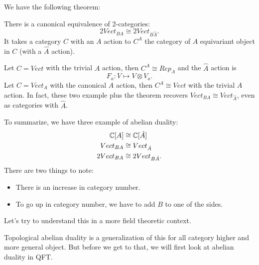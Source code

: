 \documentclass[./main]{subfiles}
\begin{document}
We have the following theorem:
\begin{theorem}
There is a canonical equivalence of 2-categories:
    \begin{equation}
        2Vect_{BA} \cong 2Vect_{B\hat{A}}.
    \end{equation}
It takes a category $C$ with an $A$ action to $C^A$ the category of $A$ equivariant object in $C$ (with a $\hat{A}$ action).
\end{theorem}

\begin{example}
Let $C = Vect$ with the trivial $A$ action, then $C^A \cong Rep_A$ and the $\hat{A}$ action is 
\begin{equation}
    F_a: V \mapsto V \otimes V_a.
\end{equation}
Let $C = Vect_A$ with the canonical $A$ action, then $C^A \cong Vect$ with the trivial $\hat{A}$ action.
In fact, these two example plus the theorem recovers $Vect_{BA} \cong Vect_{\hat{A}}$, even as categories with $\hat{A}$.
\end{example}

To summarize, we have three example of abelian duality: 
\begin{align}
    \mathbb{C}[A] &\cong \mathbb{C}[\hat{A}] \\
    Vect_{BA} &\cong Vect_{\hat{A}} \\ 
    2Vect_{BA} &\cong 2Vect_{B\hat{A}}.
\end{align}
There are two things to note:
\begin{itemize}
    \item There is an increase in category number. 
    \item To go up in category number, we have to add $B$ to one of the sides.
\end{itemize}

Let's try to understand this in a more field theoretic context. 

Topological abelian duality is a generalization of this for all category higher and more general object.
But before we get to that, we will first look at abelian duality in QFT.
\end{document}
